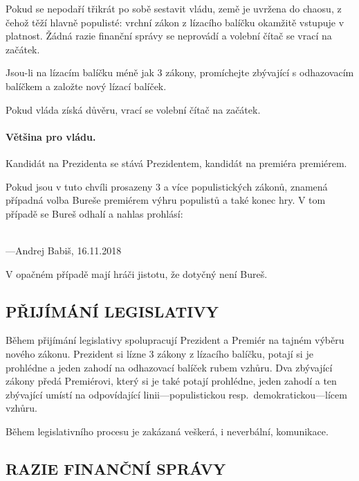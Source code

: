 \documentclass{article}
\newenvironment{redbox}{
    \vspace{1em}
    \color{red}\it
}
{
    \normalsize
    \vspace{1em}
}
\begin{document}
            Pokud se nepodaří třikrát po sobě sestavit vládu, země je uvržena do chaosu, z čehož těží hlavně populisté: vrchní zákon z lízacího balíčku okamžitě vstupuje v platnost. Žádná razie finanční správy se neprovádí a volební čítač se vrací na začátek.

            Jsou-li na lízacím balíčku méně jak $3$ zákony, promíchejte zbývající s odhazovacím balíčkem a založte nový lízací balíček.

            Pokud vláda získá důvěru, vrací se volební čítač na začátek.

            \paragraph{Většina pro vládu.} Kandidát na Prezidenta se stává Prezidentem, kandidát na premiéra pre\-mié\-rem.

            Pokud jsou v tuto chvíli prosazeny $3$ a více populistických zákonů, znamená případná volba Bureše premiérem výhru populistů a také konec hry. V tom případě se Bureš odhalí a nahlas prohlásí:

            \begin{redbox}
                \Large\noindent
                \\[.3em]
                \normalsize
                \null\hfill
                ---Andrej Babiš, 16.11.2018
            \end{redbox}

            V opačném případě mají hráči jistotu, že dotyčný není Bureš.

    \subsection*{PŘIJÍMÁNÍ LEGISLATIVY}

        Během přijímání legislativy spolupracují Prezident a Premiér na tajném výběru nového zákonu. Prezident si lízne $3$ zákony z lízacího balíčku, potají si je prohlédne a jeden zahodí na odhazovací balíček rubem vzhůru. Dva zbývající zákony předá Premiérovi, který si je také potají prohlédne, jeden zahodí a ten zbývající umístí na odpovídající linii---populistickou resp.\ de\-mo\-kra\-tic\-kou---lícem vzhůru.

        Během legislativního procesu je zakázaná veškerá, i neverbální, komunikace.

    \subsection*{RAZIE FINANČNÍ SPRÁVY}
\end{document}
